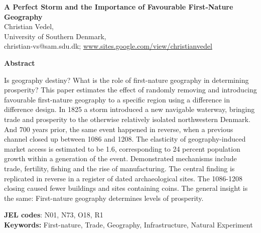 \documentclass[11pt]{article}
\begin{document}
\begin{titlepage}

    \begin{center}
        \LARGE
        \textbf{A Perfect Storm and the Importance of Favourable First-Nature Geography} \\
        
        \vspace{0.5cm}
        \Large
        Christian Vedel, \\ University of Southern Denmark,\\
        \small
        \vspace{0.25cm}
        christian-vs@sam.sdu.dk; 
        \url{www.sites.google.com/view/christianvedel} 
        
        \vspace{1.5cm}
    
        \large
        \textbf{Abstract} \\     
    \end{center}

   
    \normalsize
    Is geography destiny? What is the role of first-nature geography in determining prosperity? This paper estimates the effect of randomly removing and introducing favourable first-nature geography to a specific region using a difference in difference design. In 1825 a storm introduced a new navigable waterway, bringing trade and prosperity to the otherwise relatively isolated northwestern Denmark. And 700 years prior, the same event happened in reverse, when a previous channel closed up between 1086 and 1208. The elasticity of geography-induced market access is estimated to be 1.6, corresponding to 24 percent population growth within a generation of the event. Demonstrated mechanisms include trade, fertility, fishing and the rise of manufacturing. The central finding is replicated in reverse in a register of dated archaeological sites. The 1086-1208 closing caused fewer buildings and sites containing coins. The general insight is the same: First-nature geography determines levels of prosperity.
    
    \vspace{0.05cm} 
    \textbf{JEL codes}: N01, N73, O18, R1 \\
    \textbf{Keywords:} First-nature, Trade, Geography, Infrastructure, Natural Experiment

    
    
    \vfill
    

\end{titlepage}
\end{document}
